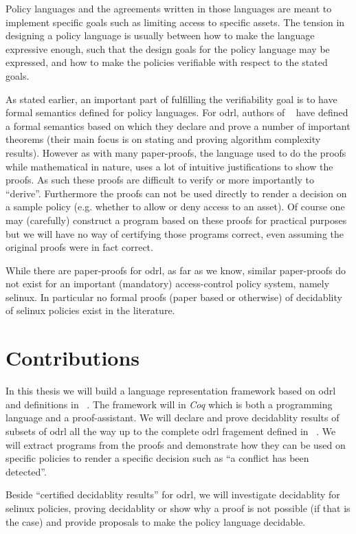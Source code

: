 Policy languages and the agreements written in those languages are meant to implement specific goals such as limiting access to specific assets. The tension in designing a policy language is usually between how to make the language expressive enough, such that the design goals for the policy language may be expressed, and how to make the policies verifiable with respect to the stated goals.

As stated earlier, an important part of fulfilling the verifiability goal is to have formal semantics defined for policy languages. For \ac{odrl}, authors of ~\cite{pucella2006} have defined a formal semantics based on which they declare and prove a number of important theorems (their main focus is on stating and proving algorithm complexity results). However as with many paper-proofs, the language used to do the proofs while mathematical in nature, uses a lot of intuitive justifications to show the proofs. As such these proofs are difficult to verify or more importantly to ``derive''. Furthermore the proofs can not be used directly to render a decision on a sample policy (e.g. whether to allow or deny access to an asset). Of course one may (carefully) construct a program based on these proofs for practical purposes but we will have no way of certifying those programs correct, even assuming the original proofs were in fact correct.

While there are paper-proofs for \ac{odrl}, as far as we know, similar paper-proofs do not exist for an important (mandatory) access-control policy system, namely \ac{selinux}. In particular no formal proofs (paper based or otherwise) of decidablity of \ac{selinux} policies exist in the literature. 


\section{Contributions}

In this thesis we will build a language representation framework based on \ac{odrl} and definitions in ~\cite{pucella2006}. The framework will in \emph{Coq} which is both a programming language and a proof-assistant. We will declare and prove decidablity results of subsets of \ac{odrl} all the way up to the complete \ac{odrl} fragement defined in ~\cite{pucella2006}. We will extract programs from the proofs and demonstrate how they can be used on specific policies to render a specific decision such as ``a conflict has been detected''. 

Beside ``certified decidablity results'' for \ac{odrl}, we will investigate decidablity for \ac{selinux} policies, proving decidablity or show why a proof is not possible (if that is the case) and provide proposals to make the policy language decidable.


